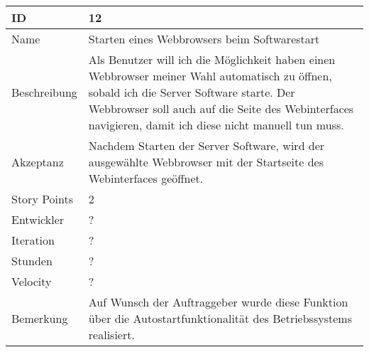 \begin{table}[htbp]
    \begin{minipage}{\linewidth}
        \setlength{\tymax}{0.5\linewidth}
        \centering
        \small
        \begin{tabulary}{\textwidth}{|l|p{10cm}|} \hline
            ID   &12\\\hline
            Name  &Starten eines Webbrowsers beim Softwarestart\\\hline
            Beschreibung&Als Benutzer will ich die Möglichkeit haben einen Webbrowser meiner Wahl automatisch zu öffnen, sobald ich die Server Software starte. Der Webbrowser soll auch auf die Seite des Webinterfaces navigieren, damit ich diese nicht manuell tun muss.\\\hline
            Akzeptanz &Nachdem Starten der Server Software, wird der ausgewählte Webbrowser mit der Startseite des Webinterfaces geöffnet.\\\hline
            Story Points&2\\\hline
            Entwickler &?\\\hline
            Iteration &?\\\hline
            Stunden  &?\\\hline
            Velocity &?\\\hline
            Bemerkung & Auf Wunsch der Auftraggeber wurde diese Funktion über die Autostartfunktionalität des Betriebssystems realisiert.
            \\\hline
        \end{tabulary}
    \end{minipage}
\end{table}


